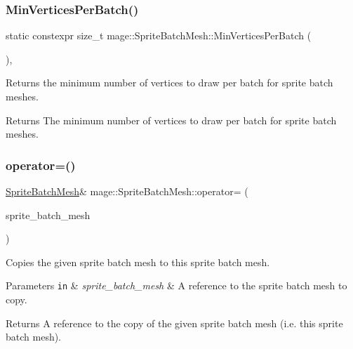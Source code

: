 \subsubsection{\texorpdfstring{Min\+Vertices\+Per\+Batch()}{MinVerticesPerBatch()}}
{\footnotesize\ttfamily static constexpr size\+\_\+t mage\+::\+Sprite\+Batch\+Mesh\+::\+Min\+Vertices\+Per\+Batch (\begin{DoxyParamCaption}{ }\end{DoxyParamCaption})\hspace{0.3cm}{\ttfamily [static]}, {\ttfamily [noexcept]}}

Returns the minimum number of vertices to draw per batch for sprite batch meshes.

\begin{DoxyReturn}{Returns}
The minimum number of vertices to draw per batch for sprite batch meshes. 
\end{DoxyReturn}
\hypertarget{classmage_1_1_sprite_batch_mesh_ac6b9c2c79286f736d9a91a79cfa70044}{}\label{classmage_1_1_sprite_batch_mesh_ac6b9c2c79286f736d9a91a79cfa70044} 
\subsubsection{\texorpdfstring{operator=()}{operator=()}\hspace{0.1cm}{\footnotesize\ttfamily [1/2]}}
{\footnotesize\ttfamily \hyperlink{classmage_1_1_sprite_batch_mesh}{Sprite\+Batch\+Mesh}\& mage\+::\+Sprite\+Batch\+Mesh\+::operator= (\begin{DoxyParamCaption}\item[{const \hyperlink{classmage_1_1_sprite_batch_mesh}{Sprite\+Batch\+Mesh} \&}]{sprite\+\_\+batch\+\_\+mesh }\end{DoxyParamCaption})\hspace{0.3cm}{\ttfamily [delete]}}

Copies the given sprite batch mesh to this sprite batch mesh.


\begin{DoxyParams}[1]{Parameters}
\mbox{\tt in}  & {\em sprite\+\_\+batch\+\_\+mesh} & A reference to the sprite batch mesh to copy. \\
\hline
\end{DoxyParams}
\begin{DoxyReturn}{Returns}
A reference to the copy of the given sprite batch mesh (i.\+e. this sprite batch mesh). 
\end{DoxyReturn}
\hypertarget{classmage_1_1_sprite_batch_mesh_a678700348ef43c46ed90d87d78c498de}{}\label{classmage_1_1_sprite_batch_mesh_a678700348ef43c46ed90d87d78c498de} 
